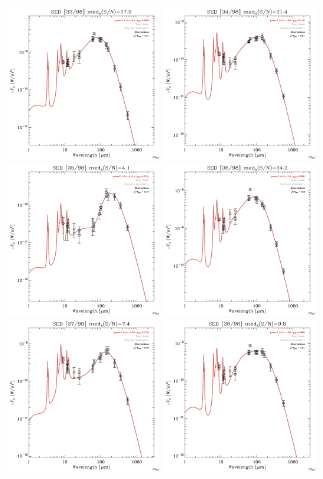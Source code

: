 \documentclass[preprint2,longabstract]{aastex}
\begin{document}
\begin{figure}
    \includegraphics[trim=0 2mm 0 0, clip, width=40mm]{SEDs/sed_33.pdf}
	\includegraphics[trim=0 2mm 0 0, clip, width=40mm]{SEDs/sed_34.pdf}
	\includegraphics[trim=0 2mm 0 0, clip, width=40mm]{SEDs/sed_35.pdf}
	\includegraphics[trim=0 2mm 0 0, clip, width=40mm]{SEDs/sed_36.pdf}
	\includegraphics[trim=0 2mm 0 0, clip, width=40mm]{SEDs/sed_37.pdf}
	\includegraphics[trim=0 2mm 0 0, clip, width=40mm]{SEDs/sed_38.pdf}

\end{figure}
\end{document}
